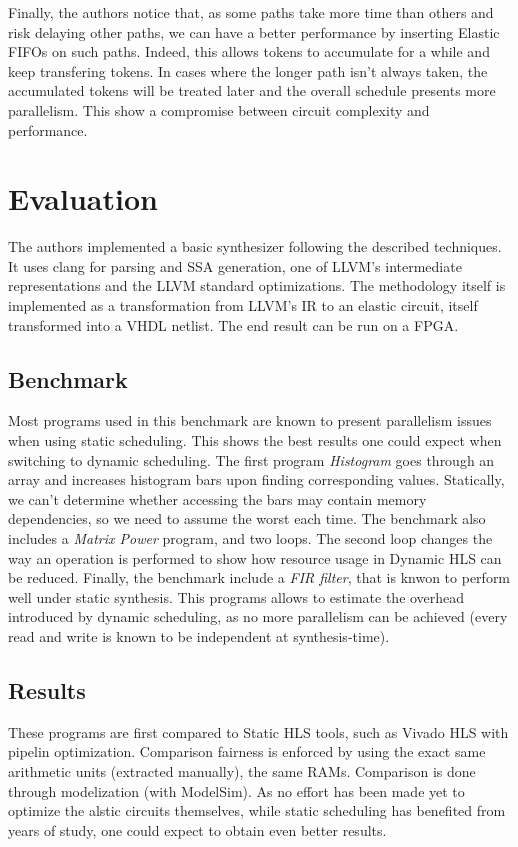 \documentclass{article}
\begin{document}
Finally, the authors notice that, as some paths take more time than others and risk delaying other paths, we can have a better performance by inserting Elastic FIFOs on such paths. Indeed, this allows tokens to accumulate for a while and keep transfering tokens. In cases where the longer path isn't always taken, the accumulated tokens will be treated later and the overall schedule presents more parallelism. This show a compromise between circuit complexity and performance.


\section{Evaluation}
The authors implemented a basic synthesizer following the described techniques.
It uses clang for parsing and SSA generation, one of LLVM's intermediate representations and the LLVM standard optimizations.
The methodology itself is implemented as a transformation from LLVM's IR to an elastic circuit, itself transformed into a VHDL netlist. The end result can be run on a FPGA.

\subsection{Benchmark}
Most programs used in this benchmark are known to present parallelism issues when using static scheduling. This shows the best results one could expect when switching to dynamic scheduling.
The first program \textit{Histogram} goes through an array and increases histogram bars upon finding corresponding values. Statically, we can't determine whether accessing the bars may contain memory dependencies, so we need to assume the worst each time.
The benchmark also includes a \textit{Matrix Power} program, and two loops. The second loop changes the way an operation is performed to show how resource usage in Dynamic HLS can be reduced.
Finally, the benchmark include a \textit{FIR filter}, that is knwon to perform well under static synthesis. This programs allows to estimate the overhead introduced by dynamic scheduling, as no more parallelism can be achieved (every read and write is known to be independent at synthesis-time).

\subsection{Results}
These programs are first compared to Static HLS tools, such as Vivado HLS with pipelin optimization. Comparison fairness is enforced by using the exact same arithmetic units (extracted manually), the same RAMs.
Comparison is done through modelization (with ModelSim).
As no effort has been made yet to optimize the alstic circuits themselves, while static scheduling has benefited from years of study, one could expect to obtain even better results.
\end{document}
